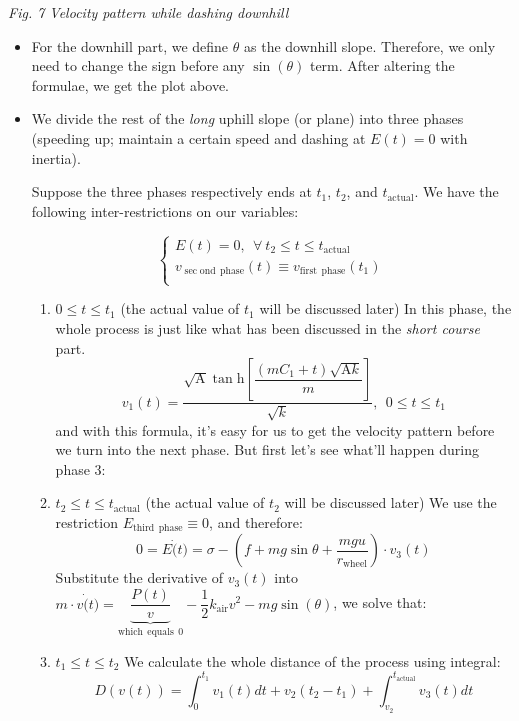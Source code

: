 \documentclass{article}
\begin{document}
\begin{itemize}
\begin{center}
						\small \textit{Fig. 7 Velocity pattern while dashing downhill}
					\end{center}

					\begin{itemize}
						\item For the downhill part, we define \(\theta\) as the downhill slope. Therefore, we only need to change the sign before any \(\sin\left(\theta\right)\) term. After altering the formulae, we get the plot above.
						\item We divide the rest of the \textit{long} uphill slope (or plane) into three phases (speeding up; maintain a certain speed and dashing at \(E(t)=0\) with inertia).

							Suppose the three phases respectively ends at \(t_1\), \(t_2\), and \(t_{\mathrm{actual}}\). We have the following inter-restrictions on our variables:

							$$
							\begin{cases}
								E\left( t \right) =0,\:\:\forall \:t_2\le t\le t_{\mathrm{actual}}\\
								v_{\sec\mathrm{ond}\:\:\mathrm{phase}}\left( t \right) \equiv v_{\mathrm{first}\:\:\mathrm{phase}}\left( t_1 \right)\\
							\end{cases}
							$$
							\begin{enumerate}
								\item \(0\leq t\leq t_1\) (the actual value of \(t_1\) will be discussed later)
									In this phase, the whole process is just like what has been discussed in the \textit{short course} part.
									\[v_1(t)=\dfrac{\sqrt{\mathrm{A}} \tan \mathrm{h}\left[\dfrac{\left(m C _1+t\right)\sqrt{\mathrm{A}k}}{m}\right]}{\sqrt{ k }},\:\:0\leq t\leq t_1\]
									and with this formula, it's easy for us to get the velocity pattern before we turn into the next phase. But first let's see what'll happen during phase 3:
								\item \(t_2\leq t\leq t_{\mathrm{actual}}\) (the actual value of \(t_2\) will be discussed later)
									We use the restriction \(E_{\mathrm{third\:\:phase}}\equiv 0\), and therefore:
									\[0=E \dot(t)=\sigma-\left(f+mg\sin\theta+\dfrac{mgu}{r_{\mathrm{wheel}}}\right)\cdot v_3(t)\]
									Substitute the derivative of \(v_3(t)\) into \(m \cdot v\dot(t)=\underset{\mathrm{which\:\:equals\:\:}0}{\underbrace{\dfrac{P (t)}{v}}}-\dfrac{1}{2} k_{\mathrm{air}} v^2-mg\sin\left(\theta\right)\), we solve that:

								\item \(t_1\leq t\leq t_2\)
									We calculate the whole distance of the process using integral:
									\[D(v(t))=\int_0^{t_1}v_1(t)dt+v_2(t_2-t_1)+\int_{v_2}^{t_{\mathrm{actual}}}v_3(t)dt\]

							\end{enumerate}
					\end{itemize}

			\end{itemize}
\end{document}
